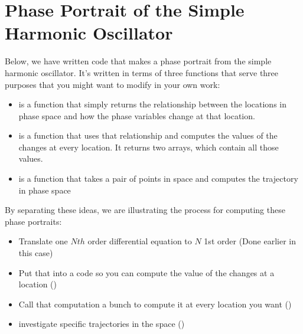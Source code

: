 \documentclass[letterpaper,10pt,english]{jupyterBook}
\begin{document}
\section{Phase Portrait of the Simple Harmonic Oscillator}
\label{\detokenize{content/1_mechanics/dynamical_1:phase-portrait-of-the-simple-harmonic-oscillator}}
\sphinxAtStartPar
Below, we have written code that makes a phase portrait from the simple harmonic oscillator. It’s written in terms of three functions that serve three purposes that you might want to modify in your own work:
\begin{itemize}
\item {} 
\sphinxAtStartPar
{} is a function that simply returns the relationship between the locations in phase space and how the phase variables change at that location.

\item {} 
\sphinxAtStartPar
{} is a function that uses that relationship and computes the values of the changes at every location. It returns two arrays, which contain all those values.

\item {} 
\sphinxAtStartPar
{} is a function that takes a pair of points in space and computes the trajectory in phase space

\end{itemize}

\sphinxAtStartPar
By separating these ideas, we are illustrating the process for computing these phase portraits:
\begin{itemize}
\item {} 
\sphinxAtStartPar
Translate one  \(Nth\) order differential equation to \(N\) 1st order (Done earlier in this case)

\item {} 
\sphinxAtStartPar
Put that into a code so you can compute the value of the changes at a location ()

\item {} 
\sphinxAtStartPar
Call that computation a bunch to compute it at every location you want ()

\item {} 
\sphinxAtStartPar
investigate specific trajectories in the space ()

\end{itemize}
\end{document}
